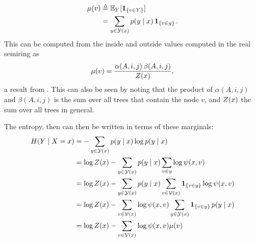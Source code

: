     \begin{align}
      \label{eq:node-marginal}
      \mu(v)
        &\triangleq \operatorname{\mathbb{E}}_Y[ \operatorname{\mathbf{1}}_{ \{ v \in Y \} } ]  \nonumber \\
        &= \sum_{ y \in \mathcal{Y}(x) } p(y \mid x) \operatorname{\mathbf{1}}_{ \{ v \in y \} }.
    \end{align}
    This can be computed from the inside and outside values computed in the real semiring as
    \begin{align}
      \mu(v) = \frac{\alpha(A, i, j) \, \beta(A, i, j)}{Z(x)},
    \end{align}
    a result from \citep{goodman1999semiring}. This can also be seen by noting that the product of $\alpha(A, i, j)$ and $\beta(A, i, j)$ is the sum over all trees that contain the node $v$, and $Z(x)$ the sum over all trees in general.

    The entropy, then can then be written in terms of these marginals:
    \begin{align}
      H(Y \mid X = x)
        &= - \sum_{ y \in \mathcal{Y}(x) } p(y \mid x) \log p(y \mid x)  \nonumber \\
        &= \log Z(x) - \sum_{ y \in \mathcal{Y}(x) } p(y \mid x) \sum_{v \in y} \log \psi(x, v)  \nonumber \\
        &= \log Z(x) - \sum_{ y \in \mathcal{Y}(x) } p(y \mid x) \sum_{ v \in \mathcal{V}(x) } \operatorname{\mathbf{1}}_{ \{ v \in y \} } \log \psi(x, v)  \nonumber \\
        &= \log Z(x) - \sum_{ v \in \mathcal{V}(x) } \log \psi(x, v)  \sum_{ y \in \mathcal{Y}(x) } \operatorname{\mathbf{1}}_{ \{ v \in y \} } p(y \mid x)  \nonumber \\
        &= \log Z(x) - \sum_{ v \in \mathcal{V}(x) } \log \psi(x, v) \mu(v)
    \end{align}

